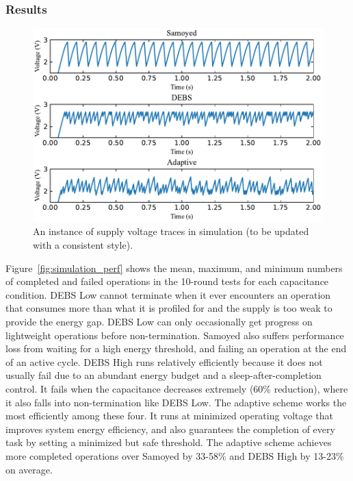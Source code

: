 \subsubsection{Results}

% 
% 

%




\begin{figure}[!t]
    \centering
    \includegraphics[width=0.9\columnwidth]{ch5_optic/figures/voltage_traces.pdf}
    \caption{An instance of supply voltage traces in simulation (to be updated with a consistent style). }
    \label{fig:simulation_voltage}
\end{figure}



Figure~\ref{fig:simulation_perf} shows the mean, maximum, and minimum numbers of completed and failed operations in the 10-round tests for each capacitance condition. 
DEBS Low cannot terminate when it ever encounters an operation that consumes more than what it is profiled for and the supply is too weak to provide the energy gap. 
DEBS Low can only occasionally get progress on lightweight operations before non-termination. 
Samoyed also suffers performance loss from waiting for a high energy threshold, and failing an operation at the end of an active cycle. 
DEBS High runs relatively efficiently because it does not usually fail due to an abundant energy budget and a sleep-after-completion control. 
It fails when the capacitance decreases extremely (60\% reduction), where it also falls into non-termination like DEBS Low.  
The adaptive scheme works the most efficiently among these four.
It runs at minimized operating voltage that improves system energy efficiency, and also guarantees the completion of every task by setting a minimized but safe threshold.
The adaptive scheme achieves more completed operations over Samoyed by 33-58\% and DEBS High by 13-23\% on average.

